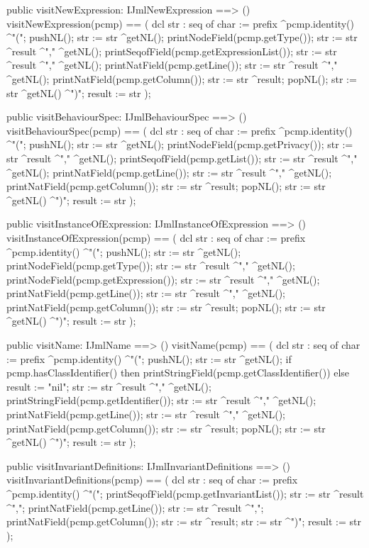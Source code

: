 \begin{vdm_al}
  public visitNewExpression: IJmlNewExpression ==> ()
  visitNewExpression(pcmp) ==
    ( dcl str : seq of char := prefix ^pcmp.identity() ^"(";
      pushNL();
      str := str ^getNL();
      printNodeField(pcmp.getType());
      str := str ^result ^"," ^getNL();
      printSeqofField(pcmp.getExpressionList());
      str := str ^result ^"," ^getNL();
      printNatField(pcmp.getLine());
      str := str ^result ^"," ^getNL();
      printNatField(pcmp.getColumn());
      str := str ^result;
      popNL();
      str := str ^getNL() ^")";
      result := str );

  public visitBehaviourSpec: IJmlBehaviourSpec ==> ()
  visitBehaviourSpec(pcmp) ==
    ( dcl str : seq of char := prefix ^pcmp.identity() ^"(";
      pushNL();
      str := str ^getNL();
      printNodeField(pcmp.getPrivacy());
      str := str ^result ^"," ^getNL();
      printSeqofField(pcmp.getList());
      str := str ^result ^"," ^getNL();
      printNatField(pcmp.getLine());
      str := str ^result ^"," ^getNL();
      printNatField(pcmp.getColumn());
      str := str ^result;
      popNL();
      str := str ^getNL() ^")";
      result := str );

  public visitInstanceOfExpression: IJmlInstanceOfExpression ==> ()
  visitInstanceOfExpression(pcmp) ==
    ( dcl str : seq of char := prefix ^pcmp.identity() ^"(";
      pushNL();
      str := str ^getNL();
      printNodeField(pcmp.getType());
      str := str ^result ^"," ^getNL();
      printNodeField(pcmp.getExpression());
      str := str ^result ^"," ^getNL();
      printNatField(pcmp.getLine());
      str := str ^result ^"," ^getNL();
      printNatField(pcmp.getColumn());
      str := str ^result;
      popNL();
      str := str ^getNL() ^")";
      result := str );

  public visitName: IJmlName ==> ()
  visitName(pcmp) ==
    ( dcl str : seq of char := prefix ^pcmp.identity() ^"(";
      pushNL();
      str := str ^getNL();
      if pcmp.hasClassIdentifier()
      then printStringField(pcmp.getClassIdentifier())
      else result := "nil";
      str := str ^result ^"," ^getNL();
      printStringField(pcmp.getIdentifier());
      str := str ^result ^"," ^getNL();
      printNatField(pcmp.getLine());
      str := str ^result ^"," ^getNL();
      printNatField(pcmp.getColumn());
      str := str ^result;
      popNL();
      str := str ^getNL() ^")";
      result := str );

  public visitInvariantDefinitions: IJmlInvariantDefinitions ==> ()
  visitInvariantDefinitions(pcmp) ==
    ( dcl str : seq of char := prefix ^pcmp.identity() ^"(";
      printSeqofField(pcmp.getInvariantList());
      str := str ^result ^",";
      printNatField(pcmp.getLine());
      str := str ^result ^",";
      printNatField(pcmp.getColumn());
      str := str ^result;
      str := str ^")";
      result := str );


\end{vdm_al}

